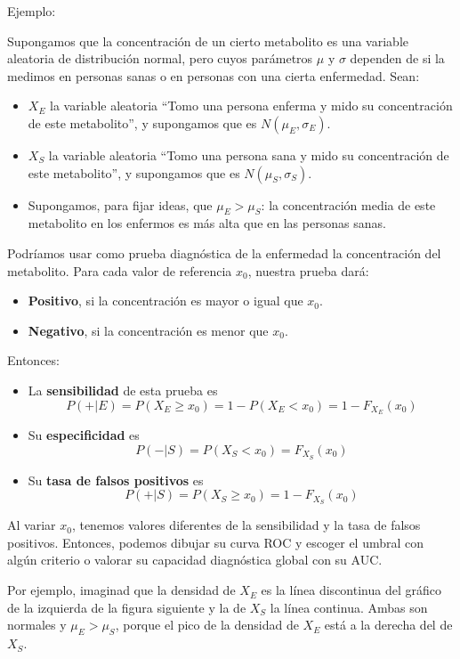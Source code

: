 \documentclass[
  spanish,
  letterpaper,
  DIV=11,
  numbers=noendperiod]{scrreprt}
\begin{document}
Ejemplo:

Supongamos que la concentración de un cierto metabolito es una variable
aleatoria de distribución normal, pero cuyos parámetros \(\mu\) y
\(\sigma\) dependen de si la medimos en personas sanas o en personas con
una cierta enfermedad. Sean:

\begin{itemize}
\item
  \(X_E\) la variable aleatoria ``Tomo una persona enferma y mido su
  concentración de este metabolito'', y supongamos que es
  \(N(\mu_E, \sigma_E)\).
\item
  \(X_S\) la variable aleatoria ``Tomo una persona sana y mido su
  concentración de este metabolito'', y supongamos que es
  \(N(\mu_S, \sigma_S)\).
\item
  Supongamos, para fijar ideas, que \(\mu_E>\mu_S\): la concentración
  media de este metabolito en los enfermos es más alta que en las
  personas sanas.
\end{itemize}

Podríamos usar como prueba diagnóstica de la enfermedad la concentración
del metabolito. Para cada valor de referencia \(x_0\), nuestra prueba
dará:

\begin{itemize}
\item
  \textbf{Positivo}, si la concentración es mayor o igual que \(x_0\).
\item
  \textbf{Negativo}, si la concentración es menor que \(x_0\).
\end{itemize}

Entonces:

\begin{itemize}
\item
  La \textbf{sensibilidad} de esta prueba es \[
  P(+|E)  =P(X_E\geqslant x_0)=1-P(X_E< x_0)=1-F_{X_E}(x_0)
  \]
\item
  Su \textbf{especificidad} es \[
  P(-|S)=P(X_S< x_0)=F_{X_S}(x_0)
  \]
\item
  Su \textbf{tasa de falsos positivos} es \[
  P(+|S)=P(X_S\geqslant  x_0)=1-F_{X_S}(x_0)
  \]
\end{itemize}

Al variar \(x_0\), tenemos valores diferentes de la sensibilidad y la
tasa de falsos positivos. Entonces, podemos dibujar su curva ROC y
escoger el umbral con algún criterio o valorar su capacidad diagnóstica
global con su AUC.

Por ejemplo, imaginad que la densidad de \(X_E\) es la línea discontinua
del gráfico de la izquierda de la figura siguiente y la de \(X_S\) la
línea continua. Ambas son normales y \(\mu_E>\mu_S\), porque el pico de
la densidad de \(X_E\) está a la derecha del de \(X_S\).
\end{document}
